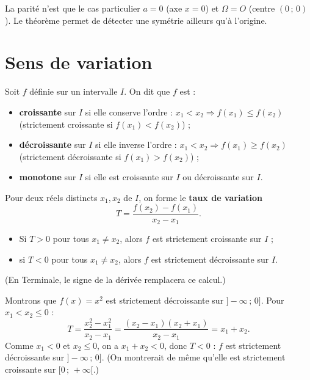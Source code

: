 \begin{remarque}
La parité n'est que le cas particulier $a=0$ (axe $x=0$) et $\Omega=O$ (centre
$(0\,;\,0)$). Le théorème permet de détecter une symétrie ailleurs qu'à l'origine.
\end{remarque}

\section{Sens de variation}

\begin{definition}
Soit $f$ définie sur un intervalle $I$. On dit que $f$ est :
\begin{itemize}
  \item \textbf{croissante} sur $I$ si elle conserve l'ordre :
        $x_1<x_2 \Rightarrow f(x_1)\le f(x_2)$ (strictement croissante si $f(x_1)<f(x_2)$) ;
  \item \textbf{décroissante} sur $I$ si elle inverse l'ordre :
        $x_1<x_2 \Rightarrow f(x_1)\ge f(x_2)$ (strictement décroissante si $f(x_1)>f(x_2)$) ;
  \item \textbf{monotone} sur $I$ si elle est croissante sur $I$ ou décroissante sur $I$.
\end{itemize}
\end{definition}

\begin{aretenir}
Pour deux réels distincts $x_1,x_2$ de $I$, on forme le \textbf{taux de variation}
\[ T=\frac{f(x_2)-f(x_1)}{x_2-x_1}. \]
\begin{itemize}
  \item Si $T>0$ pour tous $x_1\neq x_2$, alors $f$ est strictement croissante sur $I$ ;
  \item si $T<0$ pour tous $x_1\neq x_2$, alors $f$ est strictement décroissante sur $I$.
\end{itemize}
(En Terminale, le signe de la dérivée remplacera ce calcul.)
\end{aretenir}

\begin{exemple}
Montrons que $f(x)=x^2$ est strictement décroissante sur $]-\infty\,;\,0]$. Pour
$x_1<x_2\le 0$ :
\[ T=\frac{x_2^2-x_1^2}{x_2-x_1}=\frac{(x_2-x_1)(x_2+x_1)}{x_2-x_1}=x_1+x_2. \]
Comme $x_1<0$ et $x_2\le 0$, on a $x_1+x_2<0$, donc $T<0$ : $f$ est strictement
décroissante sur $]-\infty\,;\,0]$. (On montrerait de même qu'elle est strictement
croissante sur $[0\,;\,+\infty[$.)
\end{exemple}

